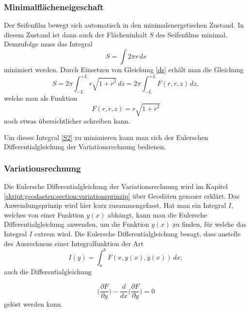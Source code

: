 \begin{refsection}
\subsubsection{Minimalflächeneigeschaft}
Der Seifenfilm bewegt sich automatisch in den minimalenergetischen Zustand. 
In diesem Zustand ist dann auch der Flächeninhalt $S$ des Seifenfilms minimal.
Demzufolge muss das Integral 
\begin{equation} \label{S1}  
  S= \int 2 \pi r \,ds 
\end{equation}
minimiert werden. 
Durch Einsetzen von Gleichung \eqref{ds} erhält man die Gleichung 
\begin{equation} \label{S2}
  S=2 \pi \int_{-L}^{+L} r\sqrt{1+\dot r^2}\,dz =2 \pi \int_{-L}^{+L}  F(r,\dot r, z) \,dz  ,
\end{equation}
welche man als Funktion 
\begin{equation} \label{F}
 F(r,\dot r, z) = r \sqrt{1+\dot r^2}
\end{equation}
noch etwas übersichtlicher schreiben kann.



Um dieses Integral \eqref{S2} zu minimieren kann man sich der Eulerschen Differentialgleichung der Variationsrechnung bedienen. 
\subsubsection{Variationsrechnung}
Die Eulersche Differentialgleichung der Variationsrechnung wird im Kapitel \ref{skript:geodaeten:section:variationsprinzip} über Geodäten genauer erklärt.
Das Anwendungsprinzip wird hier kurz zusammengefasst. Hat man ein Integral $I$, welches von einer Funktion $y(x)$ abhängt, kann man die Eulersche Differentialgleichung anwenden, um die Funktion $y(x)$ zu finden, für welche das Integral $I$ extrem wird. Die Eulersche Differentialgleichung besagt, dass anstelle des Ausrechnens  einer Integralfunktion der Art \begin{equation} \label{E_DGL1}  
  I(y)= \int_a^b F(x,y(x),\dot y(x))\,dx ,       
\end{equation}
auch die Differentialgleichung  



\begin{equation} \label{E_DGL2}
\bigg(\frac{\partial F}{\partial y}\bigg)- \frac{d}{dx} \bigg(\frac{\partial F}{\partial \dot{y}}\bigg)=0         
\end{equation}
gelöst werden kann.


\end{refsection}
